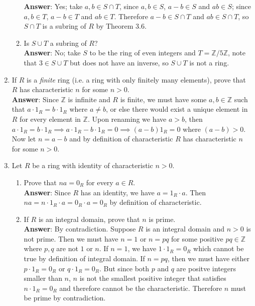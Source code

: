 \documentclass{article}
\begin{document}
\begin{enumerate}
\begin{enumerate}
                        \textbf{Answer}: Yes; take $a,b\in S\cap T$, since $a,b\in S$, $a-b\in S$ and $ab\in S$; since $a,b\in T$, $a-b\in T$ and $ab\in T$. Therefore $a-b\in S\cap T$ and $ab\in S\cap T$, so $S\cap T$ is a subring of $R$ by Theorem 3.6.
                  \item Is $S\cup T$ a subring of $R$?\\
                        \textbf{Answer}: No; take $S$ to be the ring of even integers and $T=\mathbb{Z}/5\mathbb{Z}$, note that $3\in S\cup T$ but does not have an inverse, so $S\cup T$ is not a ring.
            \end{enumerate}
      \item If $R$ is a \textit{finite} ring (i.e. a ring with only finitely many elements), prove that $R$ has characteristic $n$ for some $n>0$.\\
            \textbf{Answer}: Since $\mathbb{Z}$ is infinite and $R$ is finite, we must have some $a,b\in\mathbb{Z}$ such that $a\cdot 1_R=b\cdot 1_R$ where $a\neq b$, or else there would exist a unique element in $R$ for every element in $\mathbb{Z}$. Upon renaming we have $a>b$, then $a\cdot 1_R=b\cdot 1_R\implies a\cdot 1_R-b\cdot 1_R=0\implies (a-b)1_R=0$ where $(a-b)>0$. Now let $n=a-b$ and by definition of characteristic $R$ has characteristic $n$ for some $n>0$.
      \item Let $R$ be a ring with identity of characteristic $n>0$. \begin{enumerate}
                  \item Prove that $na=0_R$ for every $a\in R$.\\
                        \textbf{Answer}: Since $R$ has an identity, we have $a=1_R\cdot a$. Then $na=n\cdot 1_R\cdot a=0_R\cdot a=0_R$ by definition of characteristic.
                  \item If $R$ is an integral domain, prove that $n$ is prime.\\
                        \textbf{Answer}: By contradiction. Suppose $R$ is an integral domain and $n>0$ is not prime. Then we must have $n=1$ or $n=pq$ for some positive $pq\in\mathbb{Z}$ where $p,q$ are not $1$ or $n$. If $n=1$, we have $1\cdot 1_R=0_R$ which cannot be true by definition of integral domain. If $n=pq$, then we must have either $p\cdot 1_R=0_R$ or $q\cdot 1_R=0_R$. But since both $p$ and $q$ are positve integers smaller than $n$, $n$ is not the smallest positive integer that satisfies $n\cdot 1_R=0_R$ and therefore cannot be the characteristic. Therefore $n$ must be prime by contradiction.
            \end{enumerate}
\end{enumerate}
\end{document}

